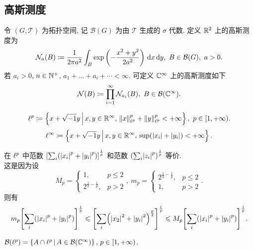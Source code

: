 \subsection{高斯测度}
\begin{definition}[高斯测度]
令 $(G,\mathcal{T})$ 为拓扑空间, 记 $\mathcal{B}(G)$ 为由 $\mathcal{T}$ 生成的 $\sigma$ 代数. 定义 $\mathbb{R}^2$ 上的高斯测度为
$$
\mathcal{N}_a(B)\dy\frac{1}{2\pi a^2}\int_B\exp\left(-\frac{x^2+y^2}{2a^2}\right)\dd x\dd y,\ B\in\mathcal{B}(G),\ a>0.
$$
若 $a_i>0$, $n\in\mathbb{N}^+$, $a_1+\dots+a_i+\cdots<\infty$. 可定义 $\mathbb{C}^\infty$ 上的高斯测度如下
$$
\mathcal{N}(B)\coloneqq\prod_{i=1}^\infty \mathcal{N}_{a_i}(B),\ B\in\mathcal{B}(\mathbb{C}^\infty).
$$
\end{definition}
\begin{definition}[$\lp$ 空间]
$$
\lp\dy\jh{x+\xs y}{x,y\in\rr^\infty,\,\fs{x}_{\lp}^p+\fs{y}_{\lp}^p<+\infty},\ p\in[1,+\infty).
$$
$$
\ell^{\infty}\coloneqq\left\{x+\sqrt{\smash{-}1} y\,\middle\vert\,x,y\in\mathbb{R}^\infty,\,\sup(|x_i|+|y_i|)<+\infty\right\}.
$$
\end{definition}
\begin{remark}[补充]
在 $\lp$ 中范数 $\zk{\sum_{i}\xk{\jd{x_i}^p+\jd{y_i}^p}}^\frac{1}{p}$ 和范数 $\xk{\sum_{i}\jd{z_i}^p}^{\frac{1}{p}}$	 等价.\\
这是因为设
\[M_p=
\begin{cases}
1, & p\leq 2\\
2^{\frac{1}{2}-\frac{1}{p}}, &p>2
\end{cases}
,\ m_p=
\begin{cases}
2^{\frac{1}{2}-\frac{1}{p}}, & p\leq 2\\
1, & p>2
\end{cases}
.\]
则有
\[m_p\zk{\sum_{i}\xk{\jd{x_i}^p+\jd{y_i}^p}}^\frac{1}{p}\leq
\zk{\sum_{i}\xk{\jd{x_2}^2+\jd{y_i}^2}^{\frac{p}{2}}}^{\frac{1}{p}}\leq M_p\zk{\sum_{i}\xk{\jd{x_i}^p+\jd{y_i}^p}}^\frac{1}{p}.
\]
\end{remark}
\begin{theorem}
$\mathcal{B}(\ell^p)=\left\{A\cap\ell^p\,\middle\vert\,A\in\mathcal{B}(\mathbb{C}^\infty)\right\},\,p\in[1,+\infty)$.
\end{theorem}
